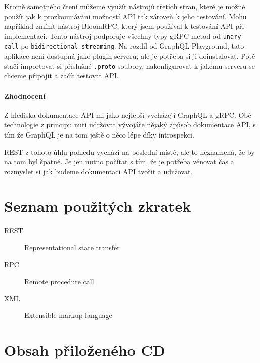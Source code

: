 \documentclass[thesis=M,czech]{FITthesis}[2019/12/23]
\begin{document}
Kromě samotného čtení můžeme využít nástrojů třetích stran, které je možné použít jak k prozkoumávání možností API tak zároveň k jeho testování. Mohu například zmínít nástroj BloomRPC, %
který jsem používal k testování API při implementaci. Tento nástroj podporuje všechny typy gRPC metod od \texttt{unary call} po \texttt{bidirectional streaming}. Na rozdíl od GraphQL Playground, tato aplikace není dostupná jako plugin serveru, ale je potřeba si ji doinstalovat. Poté stačí importovat si příslušné \texttt{.proto} soubory, nakonfigurovat k jakému serveru se chceme připojit a začít testovat API.

\subsubsection*{Zhodnocení}
Z hlediska dokumentace API mi jako nejlepší vycházejí GraphQL a gRPC. Obě technologie z principu nutí udržovat vývojáře nějaký způsob dokumentace API, s tím že GraphQL je na tom ještě o něco lépe díky introspekci.

REST z tohoto úhlu pohledu vychází na poslední místě, ale to neznamená, že by na tom byl špatně. Je jen nutno počítat s tím, že je potřeba věnovat čas a rozmyslet si jak budeme dokumentaci API tvořit a udržovat. 

\begin{conclusion}
\end{conclusion}




\appendix

\chapter{Seznam použitých zkratek}
\begin{description}
	\item[REST] Representational state transfer
	\item[RPC] Remote procedure call
	\item[XML] Extensible markup language
\end{description} 

\chapter{Obsah přiloženého CD}


\end{document}
